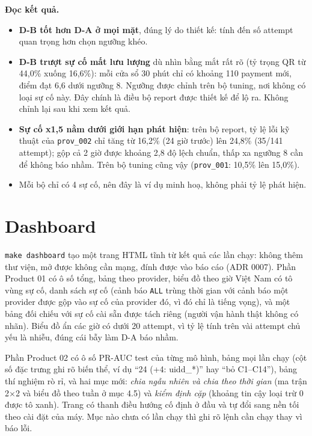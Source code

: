\documentclass[11pt,a4paper]{article}
\newcommand{\code}[1]{\texttt{\small #1}}
\begin{document}
\begin{keypoint}
\textbf{Đọc kết quả.}
\begin{itemize}
  \item \textbf{D-B tốt hơn D-A ở mọi mặt}, đúng lý do thiết kế: tính đến số attempt quan trọng hơn chọn ngưỡng khéo.
  \item \textbf{D-B trượt sự cố mất lưu lượng} dù nhìn bằng mắt rất rõ (tỷ trọng QR từ 44,0\% xuống 16,6\%): mỗi cửa sổ 30 phút chỉ có khoảng 110 payment mới, điểm đạt 6,6 dưới ngưỡng 8. Ngưỡng được chỉnh trên bộ tuning, nơi không có loại sự cố này. Đây chính là điều bộ report được thiết kế để lộ ra. Không chỉnh lại sau khi xem kết quả.
  \item \textbf{Sự cố x1,5 nằm dưới giới hạn phát hiện}: trên bộ report, tỷ lệ lỗi kỹ thuật của \code{prov\_002} chỉ tăng từ 16,2\% (24 giờ trước) lên 24,8\% (35/141 attempt); gộp cả 2 giờ được khoảng 2,8 độ lệch chuẩn, thấp xa ngưỡng 8 cần để không báo nhầm. Trên bộ tuning cũng vậy (\code{prov\_001}: 10,5\% lên 15,0\%).
  \item Mỗi bộ chỉ có 4 sự cố, nên đây là ví dụ minh hoạ, không phải tỷ lệ phát hiện.
\end{itemize}
\end{keypoint}

\section{Dashboard}
\code{make dashboard} tạo một trang HTML tĩnh từ kết quả các lần chạy: không thêm thư viện, mở được không cần mạng, đính được vào báo cáo (ADR 0007). Phần Product 01 có ô số tổng, bảng theo provider, biểu đồ theo giờ Việt Nam có tô vùng sự cố, danh sách sự cố (cảnh báo \code{ALL} trùng thời gian với cảnh báo một provider được gộp vào sự cố của provider đó, vì đó chỉ là tiếng vọng), và một bảng đối chiếu với sự cố cài sẵn được tách riêng (người vận hành thật không có nhãn). Biểu đồ ẩn các giờ có dưới 20 attempt, vì tỷ lệ tính trên vài attempt chủ yếu là nhiễu, đúng cái bẫy làm D-A báo nhầm.

Phần Product 02 có ô số PR-AUC test của từng mô hình, bảng mọi lần chạy (cột số đặc trưng ghi rõ biến thể, ví dụ ``24 (+4: uidd\_*)'' hay ``bỏ C1--C14''), bảng thí nghiệm rò rỉ, và hai mục mới: \emph{chia ngẫu nhiên và chia theo thời gian} (ma trận 2$\times$2 và biểu đồ theo tuần ở mục 4.5) và \emph{kiểm định cặp} (khoảng tin cậy loại trừ 0 được tô xanh). Trang có thanh điều hướng cố định ở đầu và tự đổi sang nền tối theo cài đặt của máy. Mục nào chưa có lần chạy thì ghi rõ lệnh cần chạy thay vì báo lỗi.
\end{document}
